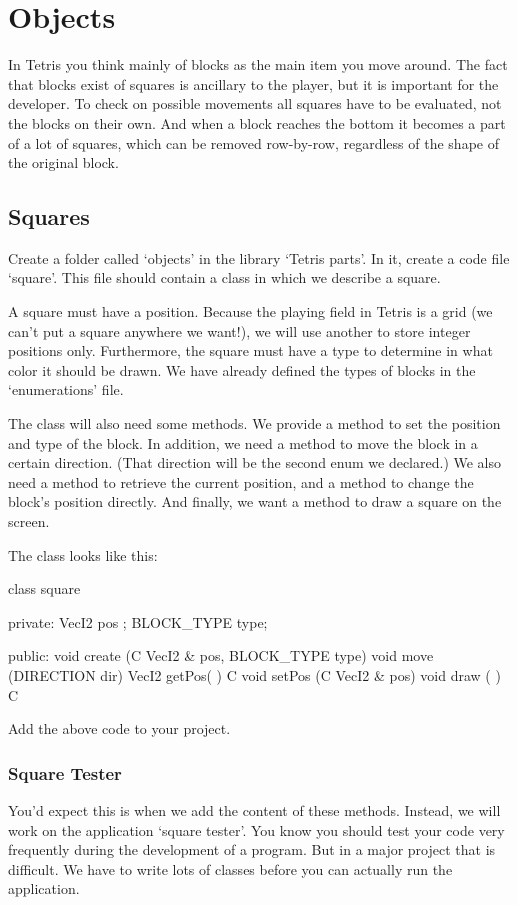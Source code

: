 \chapter{Objects}
In Tetris you think mainly of blocks as the main item you move around. The fact that blocks exist of squares is ancillary to the player, but it is important for the developer. To check on possible movements all squares have to be evaluated, not the blocks on their own. And when a block reaches the bottom it becomes a part of a lot of squares, which can be removed row-by-row, regardless of the shape of the original block.

\section{Squares}
Create a folder called `objects' in the library `Tetris parts'. In it, create a code file `square'. This file should contain a class  in which we describe a square.

A square must have a position. Because the playing field in Tetris is a grid (we can't put a square anywhere we want!), we will use another  to store integer positions only. Furthermore, the square must have a  type to determine in what color it should be drawn. We have already defined the types of blocks in the `enumerations' file.

The class  will also need some methods. We provide a  method to set the position and type of the block. In addition, we need a  method to move the block in a certain direction. (That direction will be the second enum we declared.) We also need a method to retrieve the current position, and a method to change the block's position directly. And finally, we want a method to draw a square on the screen.

The class looks like this:

\begin{code}
class square
{
private:
   VecI2      pos ; 
   BLOCK_TYPE type;
   
public:
   void create (C VecI2 & pos, BLOCK_TYPE type) {}
   void move (DIRECTION dir) {}
   VecI2 getPos(             ) C { }
   void setPos (C VecI2 & pos)   { }
	 void draw   (             ) C { }
}
\end{code}

Add the above code to your project. 

\subsection{Square Tester}
You'd expect this is when we add the content of these methods. Instead, we will work on the application `square tester'. You know you should test your code very frequently during the development of a program. But in a major project that is difficult. We have to write lots of classes before you can actually run the application.

